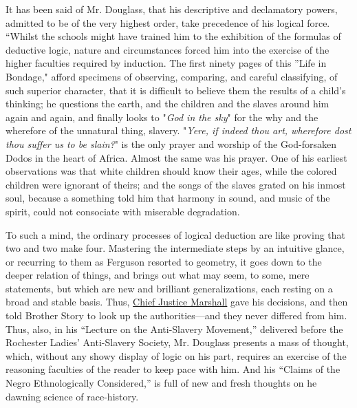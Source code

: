 It has been said of Mr. Douglass, that his descriptive and declamatory
powers, admitted to be of the very highest order, take precedence of his
logical force. ``Whilst the schools might have trained him to the
exhibition of the formulas of deductive logic, nature and circumstances
forced him into the exercise of the higher faculties required by
induction. The first ninety pages of this ''Life in Bondage," afford
specimens of observing, comparing, and careful classifying, of such
superior character, that it is difficult to believe them the results of
a child's thinking; he questions the earth, and the children and the
slaves around him again and again, and finally looks to "\emph{God in
the sky}" for the why and the wherefore of the unnatural thing, slavery.
"\emph{Yere, if indeed thou art, wherefore dost thou suffer us to be
slain?}" is the only prayer and worship of the God-forsaken Dodos in the
heart of Africa. Almost the same was his prayer. One of his earliest
observations was that white children should know their ages, while the
colored children were ignorant of theirs; and the songs of the slaves
grated on his inmost soul, because a something told him that harmony in
sound, and music of the spirit, could not consociate with miserable
degradation.

To such a mind, the ordinary processes of logical deduction are like
proving that two and two make four. Mastering the intermediate steps by
an intuitive glance, or recurring to them as Ferguson resorted to
geometry, it goes down to the deeper relation of things, and brings out
what may seem, to some, mere statements, but which are new and brilliant
generalizations, each resting on a broad and stable basis. Thus,
\href{/wiki/Author:John_Marshall_(1755-1835)}{Chief Justice Marshall}
gave his decisions, and {}then told Brother Story to look up the
authorities---and they never differed from him. Thus, also, in his
``Lecture on the Anti-Slavery Movement,'' delivered before the Rochester
Ladies' Anti-Slavery Society, Mr. Douglass presents a mass of thought,
which, without any showy display of logic on his part, requires an
exercise of the reasoning faculties of the reader to keep pace with him.
And his ``Claims of the Negro Ethnologically Considered,'' is full of
new and fresh thoughts on he dawning science of race-history.

